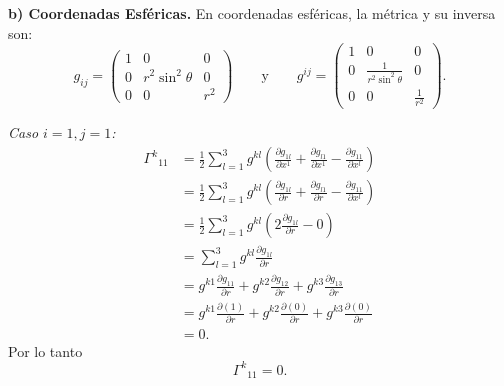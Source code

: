\documentclass[../apunte_mecanica_clasica.tex]{subfiles}%
\begin{document}
\begin{apuntebloque}{}

\textbf{b) Coordenadas Esféricas.}  
En coordenadas esféricas, la métrica y su inversa son:
\begin{equation*}
    g_{ij} =
    \begin{pmatrix}
        1 & 0 & 0 \\
        0 & r^2 \sin^2\theta & 0 \\
        0 & 0 & r^2
    \end{pmatrix}\qquad\text{y}
    \qquad
    g^{ij} =
    \begin{pmatrix}
        1 & 0 & 0 \\
        0 & \tfrac{1}{r^2 \sin^2\theta} & 0 \\
        0 & 0 & \tfrac{1}{r^2}
    \end{pmatrix}.
\end{equation*}

\textit{Caso $i=1, j=1$:}
\begin{align*}
    \Gamma^k{}_{11} 
    &= \frac{1}{2} \sum_{l=1}^3 g^{kl}
    \left( \frac{\partial g_{1l}}{\partial x^1}
         + \frac{\partial g_{l1}}{\partial x^1}
         - \frac{\partial g_{11}}{\partial x^l} \right) \\[6pt]
    &= \frac{1}{2} \sum_{l=1}^3 g^{kl}
    \left( \frac{\partial g_{1l}}{\partial r}
         + \frac{\partial g_{l1}}{\partial r}
         - \frac{\partial g_{11}}{\partial x^l} \right) \\[6pt]
    &= \frac{1}{2} \sum_{l=1}^3 g^{kl}
    \left( 2\frac{\partial g_{1l}}{\partial r}- 0\right) \\[6pt]
    &= \sum_{l=1}^3 g^{kl} \frac{\partial g_{1l}}{\partial r}\\[6pt]
    &= g^{k1} \frac{\partial g_{11}}{\partial r}+g^{k2} \frac{\partial g_{12}}{\partial r}+g^{k3} \frac{\partial g_{13}}{\partial r}\\[6pt]
    &= g^{k1} \frac{\partial (1)}{\partial r}+g^{k2} \frac{\partial (0)}{\partial r}+g^{k3} \frac{\partial (0)}{\partial r}\\[6pt]
    &=0.
\end{align*}
Por lo tanto
\begin{equation*}
    \Gamma^k{}_{11} = 0.
\end{equation*}


\end{apuntebloque}
\end{document}
